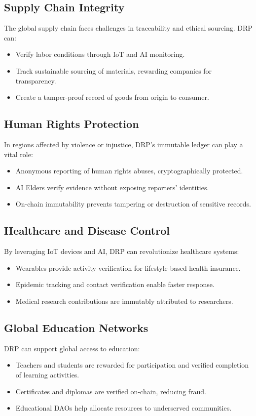 \documentclass[11pt,a4paper]{article}
\begin{document}
\subsection{Supply Chain Integrity}
The global supply chain faces challenges in traceability and ethical sourcing. DRP can:
\begin{itemize}
    \item Verify labor conditions through IoT and AI monitoring.
    \item Track sustainable sourcing of materials, rewarding companies for transparency.
    \item Create a tamper-proof record of goods from origin to consumer.
\end{itemize}

\subsection{Human Rights Protection}
In regions affected by violence or injustice, DRP’s immutable ledger can play a vital role:
\begin{itemize}
    \item Anonymous reporting of human rights abuses, cryptographically protected.
    \item AI Elders verify evidence without exposing reporters’ identities.
    \item On-chain immutability prevents tampering or destruction of sensitive records.
\end{itemize}

\subsection{Healthcare and Disease Control}
By leveraging IoT devices and AI, DRP can revolutionize healthcare systems:
\begin{itemize}
    \item Wearables provide activity verification for lifestyle-based health insurance.
    \item Epidemic tracking and contact verification enable faster response.
    \item Medical research contributions are immutably attributed to researchers.
\end{itemize}

\subsection{Global Education Networks}
DRP can support global access to education:
\begin{itemize}
    \item Teachers and students are rewarded for participation and verified completion of learning activities.
    \item Certificates and diplomas are verified on-chain, reducing fraud.
    \item Educational DAOs help allocate resources to underserved communities.
\end{itemize}
\end{document}
